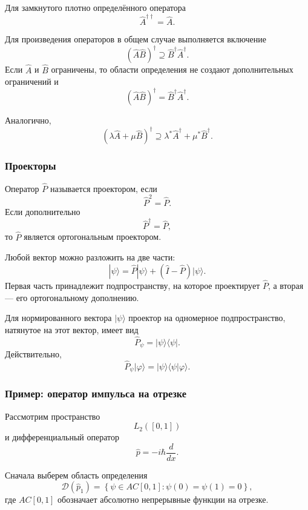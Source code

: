 \documentclass[12pt,a4paper]{article}
\begin{document}
Для замкнутого плотно определённого оператора
\[
    \boxed{
        \hat A^{\dagger\dagger}=\hat A
    }.
\]

Для произведения операторов в общем случае выполняется включение
\[
    \boxed{
        (\hat A\hat B)^\dagger
        \supseteq
        \hat B^\dagger\hat A^\dagger
    }.
\]
Если $\hat A$ и $\hat B$ ограничены, то области определения не создают
дополнительных ограничений и
\[
    \boxed{
        (\hat A\hat B)^\dagger
        =
        \hat B^\dagger\hat A^\dagger
    }.
\]

Аналогично,
\[
    \boxed{
    (\lambda\hat A+\mu\hat B)^\dagger
    \supseteq
    \lambda^*\hat A^\dagger
    +
    \mu^*\hat B^\dagger
    }.
\]


\subsubsection{Проекторы}

Оператор $\hat P$ называется проектором, если
\[
    \boxed{
        \hat P^2=\hat P
    }.
\]
Если дополнительно
\[
    \boxed{
        \hat P^\dagger=\hat P
    },
\]
то $\hat P$ является ортогональным проектором.

Любой вектор можно разложить на две части:
\[
    |\psi\rangle
    =
    \hat P|\psi\rangle
    +
    (\hat I-\hat P)|\psi\rangle.
\]
Первая часть принадлежит подпространству, на которое проектирует
$\hat P$, а вторая --- его ортогональному дополнению.

Для нормированного вектора $|\psi\rangle$ проектор на одномерное
подпространство, натянутое на этот вектор, имеет вид
\[
    \boxed{
        \hat P_\psi
        =
        |\psi\rangle\langle\psi|
    }.
\]
Действительно,
\[
    \hat P_\psi|\varphi\rangle
    =
    |\psi\rangle
    \langle\psi|\varphi\rangle.
\]


\subsubsection{Пример: оператор импульса на отрезке}

Рассмотрим пространство
\[
    L_2([0,1])
\]
и дифференциальный оператор
\[
    \boxed{
        \hat p=-i\hbar\frac{d}{dx}
    }.
\]

Сначала выберем область определения
\[
    \mathcal D(\hat p_1)
    =
    \left\{
        \psi\in AC[0,1]:
        \psi(0)=\psi(1)=0
    \right\},
\]
где $AC[0,1]$ обозначает абсолютно непрерывные функции на отрезке.
\end{document}

